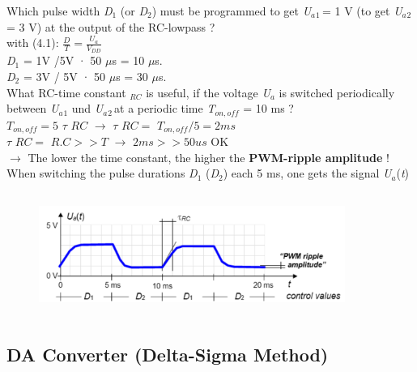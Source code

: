 Which pulse width \textit{D}${}_{1}$ (or \textit{D}${}_{2}$) must be programmed to get \textit{U${}_{a}$}${}_{1\ }$= 1 V (to get \textit{U${}_{a}$}${}_{2\ }$= 3 V) at the output of the RC-lowpass ?\\

with (4.1):  \textit{$\frac{D}{T} =\frac{U_{a} }{V_{DD} } $}  \\

\textit{D}${}_{1}$ = 1V /5V · 50 $\mu$s = 10 $\mu$s.  \\
\textit{D}${}_{2}$ = 3V / 5V · 50 $\mu$s = 30 $\mu$s.  \\  

What RC-time constant \textit{${}_{RC}$} is useful, if the voltage \textit{U${}_{a}$} is switched periodically between \textit{U${}_{a}$}${}_{1}$ und \textit{U${}_{a}$}${}_{2\ }$at a periodic time \textit{T${}_{on,off}$}  = 10 ms ? \\ 

$T_{on,off}=5$ $\tau$ $RC$ \hspace{1cm} $\rightarrow$ $\tau$ $RC=$  $T_{on,off}/5=2ms$ \\
$\tau$ $RC=$ $R.C >>T$ \hspace{0.80cm} $\rightarrow$ $2ms >> 50 us$ OK\\

$\rightarrow$ The lower the time constant, the higher the \textbf{PWM-ripple amplitude} ! \\

When switching the pulse durations \textit{D}${}_{1}$ (\textit{D}${}_{2}$) each 5 ms, one gets the signal \textit{U${}_{a}$}(\textit{t})

    \begin{figure}[h]
    \centering
    \includegraphics[width=10cm, height=4cm]{Images/image173.png}
    \label{fig:Fig 127}
    \end{figure}

\subsection{DA Converter (Delta-Sigma Method)}

